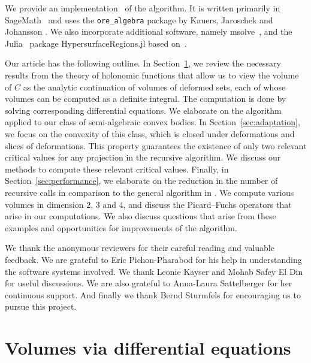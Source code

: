\documentclass[sigconf, nonacm]{acmart} %
\begin{document}
We provide an implementation~\cite{implementation} of the algorithm. It is written primarily in  SageMath~\cite{sagemath} and uses the \texttt{ore\_algebra} package by Kauers, Jaroschek and Johansson \cite{ore_algebra}. We also incorporate additional software, namely msolve~\cite{msolve}, and the Julia~\cite{bezanson2017julia} package {HypersurfaceRegions.jl} based on~\cite{reinke2024hypersurfacearrangementsgenerichypersurfaces}.


Our article has the following outline. In Section~\ref{sec:background}, we review the necessary results from the theory of holonomic functions that allow us to view the volume of $C$ as the analytic continuation of volumes of deformed sets, each of whose volumes can be computed as a definite integral. The computation is done by solving corresponding differential equations. We elaborate on the algorithm applied to our class of semi-algebraic convex bodies. In Section~\ref{sec:adaptation}, we focus on the convexity of this class, which is closed under deformations and slices of deformations. This property guarantees the existence of only two relevant critical values for any projection in the recursive algorithm. We discuss our methods to compute these relevant critical values. Finally, in Section~\ref{sec:performance}, we elaborate on the reduction in the number of recursive calls in comparison to the general algorithm in \cite{Lairez_volumes_semi_algebraic_sets}. We compute various volumes in dimension $2$, $3$ and $4$, and discuss the Picard--Fuchs operators that arise in our computations. We also discuss questions that arise from these examples and opportunities for improvements of the algorithm.

\begin{acks}
We thank the anonymous reviewers for their careful reading and valuable feedback. We are grateful to Eric Pichon-Pharabod for his help in understanding the software systems involved. We thank Leonie Kayser and Mohab Safey El Din for useful discussions.
We are also grateful to Anna-Laura Sattelberger for her continuous support. And finally we thank Bernd Sturmfels for encouraging us to pursue this project. 
\end{acks}

\section{Volumes via differential equations}\label{sec:background}
\end{document}
